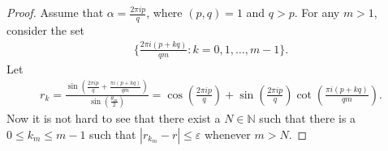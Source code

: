 \documentclass[a4paper,10pt]{amsart}
\newcommand{\N}{\mathbb N} %
\begin{document}
\begin{proof}
    Assume that $\alpha = \frac{2\pi i p}{q}$, where $(p, q) = 1$ and 
    $q > p$. For any $m > 1$, consider the set
    \begin{align*}
        \{\frac{2\pi i (p + kq)}{qm} : k = 0, 1, \ldots, m-1 \}. 
    \end{align*}
    Let  
    \begin{align*}
        r_{k} = \frac{\sin (\frac{2\pi i p}{q}+ 
        \frac{\pi i (p + kq)}{qm})}
        {\sin (\frac{\theta_m}{2})}
     = \cos (\frac{2\pi i p}{q}) + \sin (\frac{2\pi i p}{q})
     \cot (\frac{\pi i (p + kq)}{qm}).
    \end{align*}
    Now it is not hard to see that there exist a $N \in \N$ such that
    there is a $0 \leq k_m \leq m-1$ such that 
    $|r_{k_m} - r| \leq \varepsilon$ whenever $m > N$. 
\end{proof}





%

%

\end{document}
